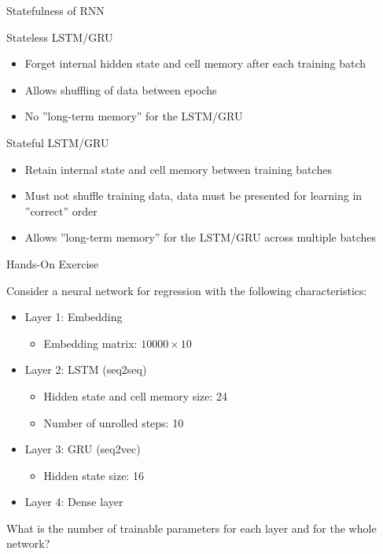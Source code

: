 \documentclass[ignorenonframetext,xcolor=x11names]{beamer}
\begin{document}
\begin{frame}{Statefulness of RNN}
\small
\begin{block}{Stateless LSTM/GRU}
\begin{itemize}
   \item Forget internal hidden state and cell memory after each training batch
   \item Allows shuffling of data between epochs
   \item No ''long-term memory'' for the LSTM/GRU
\end{itemize}
\end{block}
\begin{block}{Stateful LSTM/GRU}
\begin{itemize}
   \item Retain internal state and cell memory between training batches
   \item Must not shuffle training data, data must be presented for learning in ''correct'' order
   \item Allows ''long-term memory'' for the LSTM/GRU across multiple batches
\end{itemize}
\end{block}
\end{frame}


\begin{frame}{Hands-On Exercise}

Consider a neural network for regression with the following characteristics:

\begin{itemize}
   \item Layer 1: Embedding
   \begin{itemize}
      \item Embedding matrix: $10000 \times 10$
   \end{itemize}
   \item Layer 2: LSTM (seq2seq)
   \begin{itemize}
      \item Hidden state and cell memory size: 24
      \item Number of unrolled steps: 10
   \end{itemize}
   \item Layer 3: GRU (seq2vec)
   \begin{itemize}
      \item Hidden state size: 16
   \end{itemize}
   \item Layer 4: Dense layer
\end{itemize}

What is the number of trainable parameters for each layer and for the whole network?
\end{frame}
\end{document}
